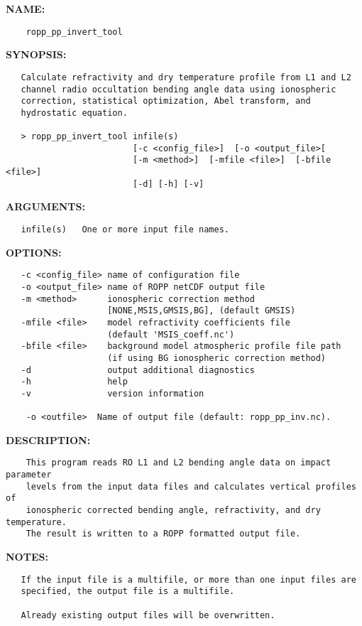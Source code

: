 \label{ch:robo89}
\label{ch:Programs_ropp_pp_invert_tool}
\textbf{NAME:}\hspace{0.08in}\begin{Verbatim}
    ropp_pp_invert_tool
\end{Verbatim}
\textbf{SYNOPSIS:}\hspace{0.08in}\begin{Verbatim}
   Calculate refractivity and dry temperature profile from L1 and L2
   channel radio occultation bending angle data using ionospheric
   correction, statistical optimization, Abel transform, and 
   hydrostatic equation.

   > ropp_pp_invert_tool infile(s)
                         [-c <config_file>]  [-o <output_file>[
                         [-m <method>]  [-mfile <file>]  [-bfile <file>]
                         [-d] [-h] [-v]
\end{Verbatim}
\textbf{ARGUMENTS:}\hspace{0.08in}\begin{Verbatim}
   infile(s)   One or more input file names.
\end{Verbatim}
\textbf{OPTIONS:}\hspace{0.08in}\begin{Verbatim}
   -c <config_file> name of configuration file
   -o <output_file> name of ROPP netCDF output file
   -m <method>      ionospheric correction method
                    [NONE,MSIS,GMSIS,BG], (default GMSIS)
   -mfile <file>    model refractivity coefficients file
                    (default 'MSIS_coeff.nc')
   -bfile <file>    background model atmospheric profile file path
                    (if using BG ionospheric correction method)
   -d               output additional diagnostics
   -h               help
   -v               version information

    -o <outfile>  Name of output file (default: ropp_pp_inv.nc).
\end{Verbatim}
\textbf{DESCRIPTION:}\hspace{0.08in}\begin{Verbatim}
    This program reads RO L1 and L2 bending angle data on impact parameter 
    levels from the input data files and calculates vertical profiles of 
    ionospheric corrected bending angle, refractivity, and dry temperature. 
    The result is written to a ROPP formatted output file.
\end{Verbatim}
\textbf{NOTES:}\hspace{0.08in}\begin{Verbatim}
   If the input file is a multifile, or more than one input files are
   specified, the output file is a multifile.

   Already existing output files will be overwritten.
\end{Verbatim}
